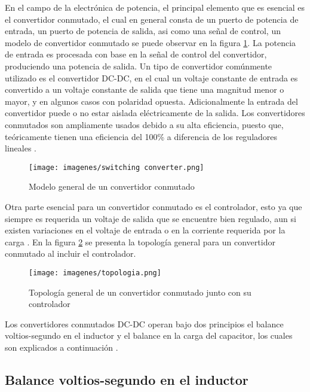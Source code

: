 En el campo de la electrónica de potencia, el principal elemento que es esencial es el convertidor conmutado, el cual
en general consta de un puerto de potencia de entrada, un puerto de potencia de salida, asi como una señal de control,
un modelo de convertidor conmutado se puede observar en la figura \ref{fig:switching}. La potencia de entrada es procesada
con base en la señal de control del convertidor, produciendo una potencia de salida. Un tipo de convertidor comúnmente utilizado
es el convertidor DC-DC, en el cual un voltaje constante de entrada es convertido a un voltaje constante de salida que tiene 
una magnitud menor o mayor, y en algunos casos con polaridad opuesta. Adicionalmente la entrada del convertidor puede o no estar  aislada eléctricamente de la salida. Los convertidores conmutados son
ampliamente usados debido a su alta eficiencia, puesto que, teóricamente tienen una eficiencia del 
100\% a diferencia de los reguladores lineales \cite{erickson_fundamentals_2020}.

\begin{figure}[H]
   \centering
   \texttt{[image: imagenes/switching converter.png]}
   \caption{Modelo general de un convertidor conmutado \cite{erickson_fundamentals_2020}}
   \label{fig:switching}
\end{figure}

Otra parte esencial para un convertidor conmutado es el controlador,  esto ya que siempre es requerida
un voltaje de salida que se encuentre bien regulado, aun si existen variaciones en el voltaje de entrada
o en la corriente requerida por la carga \cite{erickson_fundamentals_2020}. En la figura \ref{fig:controlador} se 
presenta la topología general para un convertidor conmutado al incluir el controlador. 

\begin{figure}[H]
    \centering
    \texttt{[image: imagenes/topologia.png]}
    \caption{Topología general de un convertidor conmutado junto con su controlador \cite{erickson_fundamentals_2020}}
    \label{fig:controlador}
\end{figure}

Los convertidores conmutados DC-DC operan bajo dos principios el balance voltios-segundo en el inductor y el balance en la carga del capacitor, los cuales son explicados a continuación \cite{erickson_fundamentals_2020}.


\subsection{Balance voltios-segundo en el inductor}

